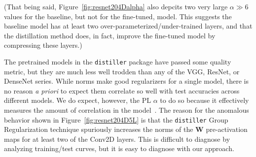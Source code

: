 (That being said, Figure~\ref{fig:resnet204Dalpha} also depcits two very large $\alpha\gg 6$ values for the baseline, but not for the fine-tuned, model.
This suggests the baseline model has at least two over-parameterized/under-trained layers, and that the distillation method does, in fact, improve the fine-tuned model by compressing these layers.)

The pretrained models in the \texttt{distiller} package have passed some quality metric, but they are much less well trodden than any of the 
VGG, ResNet, or DenseNet series.  %
While norms make good regularizers for a single model, there is no reason \emph{a priori} to expect them correlate so well with test accuracies across different models.
We do expect, however, the PL $\alpha$ to do so because it effectively measures the amount of correlation in the model~\cite{MM18_TR, MM19_HTSR_ICML, MM20_SDM}.
The reason for the anomalous behavior shown in 
Figure~\ref{fig:resnet204D5L}
is that the \texttt{distiller} Group Regularization technique 
spuriously increases the norms of the $\mathbf{W}$ pre-activation maps for at least two of the Conv2D layers.
This is difficult to diagnose by analyzing training/test curves, but it is easy to diagnose with our approach.


